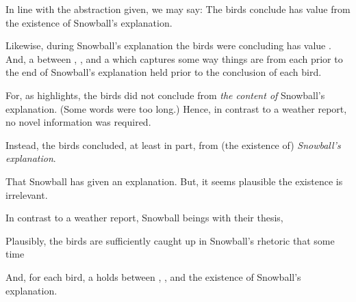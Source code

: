 \begin{note}
  In line with the abstraction given, we may say:
  The birds conclude  has value  from the existence of Snowball's explanation.

  Likewise, during Snowball's explanation the birds were concluding  has value .
  And, a \ros{} between , , and a \pool{} which captures some way things are from each  prior to the end of Snowball's explanation held prior to the conclusion of each bird.

  For, as \citeauthor{Orwell:1976aa} highlights, the birds did not conclude  from \emph{the content of} Snowball's explanation.
  (Some words were too long.)
  Hence, in contrast to a weather report, no novel information was required.




  Instead, the birds concluded, at least in part, from (the existence of) \emph{Snowball's explanation}.


  That Snowball has given an explanation.
  But, it seems plausible the existence is irrelevant.
  

  In contrast to a weather report, Snowball beings with their thesis, 

  Plausibly, the birds are sufficiently caught up in Snowball's rhetoric that some time 
  
  And, for each bird, a \ros{} holds between , , and the existence of Snowball's explanation.
\end{note}



